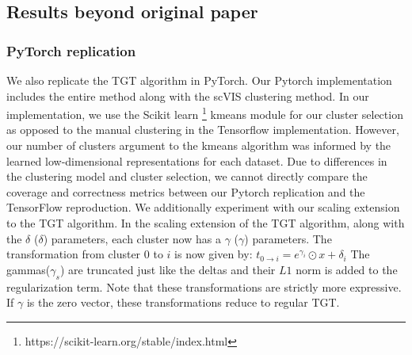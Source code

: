 


\subsection{Results beyond original paper}

\subsubsection{PyTorch replication}
We also replicate the TGT algorithm in PyTorch. Our Pytorch implementation includes the entire method along with the scVIS clustering method. In our implementation, we use the Scikit learn \footnote{https://scikit-learn.org/stable/index.html} kmeans module for our cluster selection as opposed to the manual clustering in the Tensorflow implementation. However, our number of clusters argument to the kmeans algorithm was informed by the learned low-dimensional representations for each dataset. Due to differences in the clustering model and cluster selection, we cannot directly compare the coverage and correctness metrics between our Pytorch replication and the TensorFlow reproduction. We additionally experiment with our scaling extension to the TGT algorithm. In the scaling extension of the TGT algorithm, along with the $\delta$ ($\delta$) parameters, each cluster now has a $\gamma$ ($\gamma$) parameters. The transformation from cluster $0$ to $i$ is now given by:
$t_{0 \to i} = e^{\gamma_i} \odot x + \delta_i$
The gammas($\gamma_s$) are truncated just like the deltas and their $L1$ norm is added to the regularization term. Note that these transformations are strictly more expressive. If $\gamma$ is the zero vector, these transformations reduce to regular TGT. 
